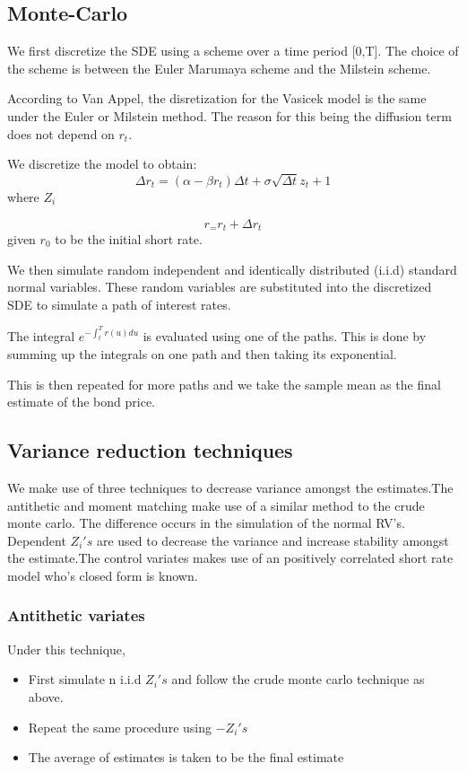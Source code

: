 \documentclass[12pt,a4paper]{article}
\begin{document}
\subsection{Monte-Carlo}

We first discretize the SDE using a scheme over a time period [0,T]. The choice of the scheme is between the Euler Marumaya scheme and the Milstein scheme.
	
According to Van Appel, the disretization for the Vasicek model is the same under the Euler or Milstein method. The reason for this being the diffusion term does not depend on $r_t$.  
	
We discretize the model to obtain:
$$ \Delta r_t= (\alpha-\beta r_t)\Delta t+ \sigma \sqrt{\Delta t} z_t+1$$ where $Z_i$
	
$$r_=r_t+\Delta r_t$$ given $r_0$ to be the initial short rate.
	
We then simulate random independent and identically distributed (i.i.d) standard normal variables. These random variables are substituted into the discretized SDE to simulate a path of interest rates.
	
The integral $e^{-\int_{t}^{T} r(u)du}$ is evaluated using one of the paths. This is done by summing up the integrals on one path and then taking its exponential. 
	
This is then repeated for more paths and we take the sample mean as the final estimate of the bond price.
	 
	 


\subsection{Variance reduction techniques}

We make use of three techniques to decrease variance amongst the estimates.The antithetic and moment matching make use of a similar method to the crude monte carlo. The difference occurs in the simulation of the normal RV's. Dependent $Z_i's$  are used to decrease the variance and increase stability amongst the estimate.The control variates makes use of an positively correlated short rate model who's closed form is known.    


\subsubsection{Antithetic variates}

Under this technique, 

\begin{itemize}
	\item First simulate n i.i.d $Z_i's$ and follow the crude monte carlo technique as above.
	\item Repeat the same procedure using  $-Z_i's$
	\item The average of estimates is taken to be the final estimate 
\end{itemize}
\end{document}

